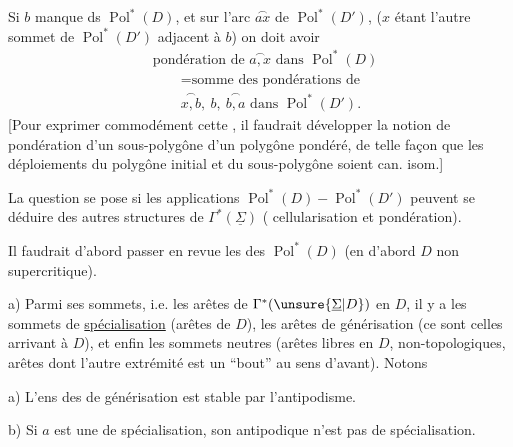 

Si $b$ manque ds $\operatorname{Pol}^*(D)$, et sur l'arc $\overset{\frown}{ax}$ de $\operatorname{Pol}^*(D')$, ($x$ étant l'autre sommet de $\operatorname{Pol}^*(D')$ adjacent à $b$) on doit avoir
\[
\begin{aligned}
&\text{pondération de $\overset{\frown}{a,x}$ dans $\operatorname{Pol}^*(D)$}\\
&\qquad=\text{somme des pondérations de}\\
&\qquad\overset{\frown}{x,b},\ b,\ \overset{\frown}{b,a}\text{ dans }\operatorname{Pol}^*(D').
\end{aligned}
\]
[Pour exprimer commodément cette , il faudrait développer la notion de pondération d'un sous-polygône d'un polygône pondéré,  de telle façon que les déploiements du polygône  initial et du sous-polygône soient can. isom.]

La question se pose si les  applications $\operatorname{Pol}^*(D)\mathbin{-}\operatorname{Pol}^*(D')$ peuvent se déduire des autres structures de $\Gamma^*(\underline\Sigma)$ ( cellularisation et  pondération).

Il faudrait d'abord passer en revue les  des  $\operatorname{Pol}^*(D)$ (en d'abord $D$ non supercritique).

a) Parmi ses sommets,  i.e. les arêtes de $\Gamma^*(\unsure{\underline\Sigma|D})$ en $D$, il y a les sommets de \uline{spécialisation} (arêtes   de $D$), les arêtes de générisation (ce sont celles arrivant à $D$), et enfin les sommets neutres (arêtes libres en $D$, non-topologiques, arêtes dont l'autre extrémité est un ``bout'' au sens d'avant). Notons

a) L'ens des   de générisation est stable par l'antipodisme.

b) Si $a$ est une   de spécialisation, son antipodique n'est pas   de spécialisation.

